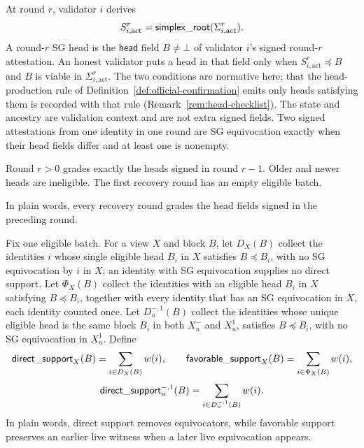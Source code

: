 \begin{definition}\label{def:sg-head}
At round \(r\), validator \(i\) derives
\[
 S_{i,\mathrm{act}}^r=\mathsf{simplex\_root}(\Sigma_{i,\mathrm{act}}^r).
\]
A round-\(r\) SG head is the \(\mathsf{head}\) field \(B\neq\bot\) of
validator \(i\)'s signed round-\(r\) attestation.  An honest validator puts a
head in that field only when \(S_{i,\mathrm{act}}^r\preceq B\) and \(B\) is
viable in \(\Sigma_{i,\mathrm{act}}^r\).  The two conditions are normative here; that the head-production rule
of Definition~\ref{def:official-confirmation} emits only heads
satisfying them is recorded with that rule
(Remark~\ref{rem:head-checklist}).  The state and ancestry are validation
context and are not extra signed fields.  Two signed attestations from one
identity in one round are SG equivocation exactly when their head fields
differ and at least one is nonempty.

Round \(r>0\) grades exactly the heads signed in round \(r-1\).  Older and
newer heads are ineligible.  The first recovery round has an empty eligible
batch.

In plain words, every recovery round grades the head fields signed in the
preceding round.
\end{definition}

\begin{definition}\label{def:grade-support}
Fix one eligible batch.  For a view \(X\) and block \(B\), let \(D_X(B)\)
collect the identities \(i\) whose single eligible head \(B_i\) in \(X\)
satisfies \(B\preceq B_i\), with no SG equivocation by \(i\) in \(X\); an
identity with SG equivocation supplies no direct support.  Let \(\Phi_X(B)\)
collect the identities with an eligible head \(B_i\) in \(X\) satisfying
\(B\preceq B_i\), together with every identity that has an SG equivocation
in \(X\), each identity counted once.  Let \(D_u^{-,1}(B)\) collect the
identities whose unique eligible head is the same block \(B_i\) in both
\(X_u^-\) and \(X_u^1\), satisfies \(B\preceq B_i\), with no SG
equivocation in \(X_u^1\).  Define
\[
 \mathsf{direct\_support}_X(B)=\sum_{i\in D_X(B)}w(i),\qquad
 \mathsf{favorable\_support}_X(B)=\sum_{i\in \Phi_X(B)}w(i),
\]
\[
 \mathsf{direct\_support}_u^{-,1}(B)=\sum_{i\in D_u^{-,1}(B)}w(i).
\]
In plain words, direct support removes equivocators, while favorable support
preserves an earlier live witness when a later live equivocation appears.
\end{definition}

